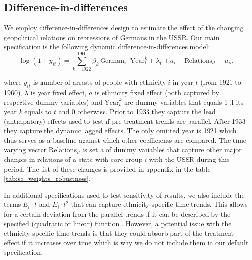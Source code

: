 \subsection{Difference-in-differences} \label{subsec:methodology_did}
We employ difference-in-differences design to estimate the effect of the changing geopolitical relations on repressions of Germans in the USSR. 
Our main specification is the following dynamic difference-in-differences model:
\begin{equation}
 \log\left(1 + y_{it}\right) = \sum_{k= 1922}^{1960} \beta_k \, \text{German}_{i} \cdot \text{Year}_{t}^k +  \lambda_t + a_i +  \text{Relations}_{it}   + u_{it},
 \label{eq:dynamic_did}
\end{equation}

where $y_{it}$ is number of arrests of people with ethnicity $i$ in year $t$ (from 1921 to 1960), $\lambda$ is year fixed effect, $a$ is ethnicity fixed effect (both captured by respective dummy variables) and  $\text{Year}_{t}^k$ are  dummy variables  that equals 1 if its year $k$ equals to $t$ and 0 otherwise.
Prior to  1933 they capture the lead (anticipatory) effects  used to test if pre-treatment trends are parallel. After 1933 they capture the dynamic lagged effects. The only omitted year is 1921 which thus serves as a baseline against which other coefficients are compared. 
The time-varying vector $\text{Relations}_{it}$ is set a of dummy variables that capture other major changes in relations of a state with core group $i$ with the USSR during this period. The list of these changes is provided in appendix in the table \ref{tab:sc_weights_robustness}.

In additional specifications used to test sensitivity of results, we also include  the terms $ E_i \cdot t$ and $ E_i \cdot t^2$  that can capture  ethnicity-specific time trends. 
This allows for a certain  deviation from the parallel trends if it can be described by the specified (quadratic or linear) function \citep[chapter 5]{angrist_mostly_2009}. 
However, a potential issue with the ethnicity-specific time trends is that they could absorb part of the treatment effect if it increases over time \citep{meer_effects_2016} which is why we do not include them in our default specification. 


